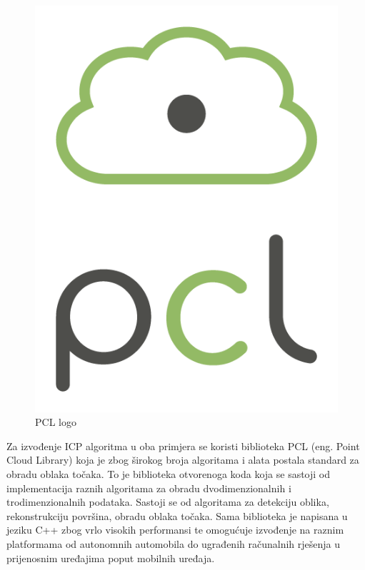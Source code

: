 \begin{figure}[ht!]
  \centering
  \includegraphics[scale=0.2]{images/pcl_logo.png}
  \caption{PCL logo}
  \label{fig:pcl_logo}
\end{figure}

Za izvođenje ICP algoritma u oba primjera se koristi biblioteka PCL (eng. Point Cloud Library) koja je zbog širokog broja algoritama i alata postala standard za obradu oblaka točaka. To je biblioteka otvorenoga koda koja se sastoji od implementacija raznih algoritama za obradu dvodimenzionalnih i trodimenzionalnih podataka. Sastoji se od algoritama za detekciju oblika, rekonstrukciju površina, obradu oblaka točaka. Sama biblioteka je napisana u jeziku C++ zbog vrlo visokih performansi te omogućuje izvođenje na raznim platformama od autonomnih automobila do ugrađenih računalnih rješenja u prijenosnim uređajima poput mobilnih uređaja.
\pagebreak